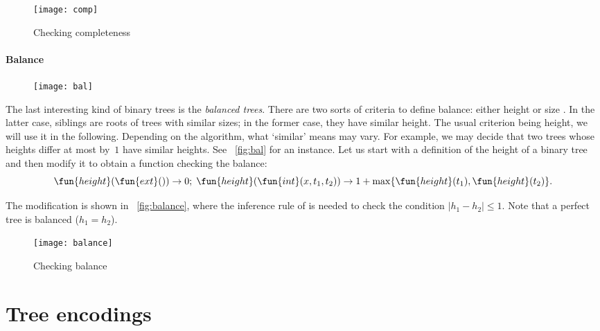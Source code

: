 \bigskip

\begin{figure}[H]
\centering
\texttt{[image: comp]}
\caption{Checking completeness}
\label{fig:comp}
\end{figure}

\paragraph{Balance}

\begin{wrapfigure}[7]{r}[0pt]{0pt}
\centering
\texttt{[image: bal]}
\caption{}
\label{fig:bal}
\end{wrapfigure}
The last interesting kind of binary trees is the \emph{balanced
  trees}. There are two sorts of
criteria to define balance: either height or size
\citep{NievergeltReingold_1972,HiraiYamamoto_2011}. In the latter
case, siblings are roots of trees with similar sizes; in the former
case, they have similar height. The usual criterion being height, we
will use it in the following. Depending on the algorithm, what
`similar' means may vary. For example, we may decide that two trees
whose heights differ at most by~\(1\) have similar heights. See
\fig~\vref{fig:bal} for an instance. Let us start with a definition of
the height of a
binary tree and then modify it to obtain a function checking the
balance:
\begin{equation*}
\fun{height}(\fun{ext}()) \rightarrow 0;
\;
\fun{height}(\fun{int}(x,t_1,t_2)) \rightarrow 1 +
\max\{\fun{height}(t_1), \fun{height}(t_2)\}.
\end{equation*}

The modification is shown in \fig~\vref{fig:balance}, where the
inference rule of  is
needed to check the condition \(|h_1 - h_2| \leqslant 1\). Note that a
perfect tree is balanced (\(h_1 = h_2\)).

\bigskip

\begin{figure}[h]
\centering
\texttt{[image: balance]}
\caption{Checking balance}
\label{fig:balance}
\end{figure}

\section{Tree encodings}

